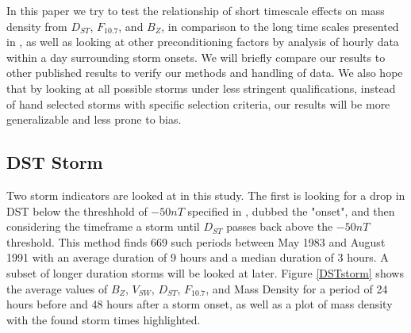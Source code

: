 \documentclass[10pt,twocolumn]{article}
\begin{document}
In this paper we try to test the relationship of short timescale effects on mass density from $D_{ST}$, $F_{10.7}$, and $B_Z$, in comparison to the long time scales presented in \cite{Takahashi2010,Takahashi2006}, as well as looking at other preconditioning factors by analysis of hourly data within a day surrounding storm onsets. We will briefly compare our results to other published results to verify our methods and handling of data. We also hope that by looking at all possible storms under less stringent qualifications, instead of hand selected storms with specific selection criteria, our results will be more generalizable and less prone to bias.

\subsection{DST Storm}
Two storm indicators are looked at in this study. The first is looking for a drop in DST below the threshhold of $-50nT$ specified in \cite{Takahashi2010}, dubbed the "onset", and then considering the timeframe a storm until $D_{ST}$ passes back above the $-50nT$ threshold. This method finds 669 such periods between May 1983 and August 1991 with an average duration of 9 hours and a median duration of 3 hours. A subset of longer duration storms will be looked at later. Figure \ref{DSTstorm} shows the average values of $B_Z$, $V_{SW}$, $D_{ST}$, $F_{10.7}$, and Mass Density for a period of 24 hours before and 48 hours after a storm onset, as well as a plot of mass density with the found storm times highlighted.
\end{document}
